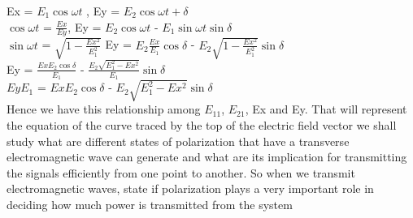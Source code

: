Ex = $E_{1}\cos\omega t$ , Ey  = $E_{2}\cos\omega t + \delta$\\

$\cos\omega t$ = $\frac{Ex}{Ey}$, Ey = $E_{2}\cos\omega t$ - $E_{1}\sin\omega t\sin\delta$\\

$\sin\omega t$ = $\sqrt{1 - \frac{Ex^2}{E_{1}^2}}$ Ey = $E_{2}\frac{Ex}{E_{1}}\cos\delta$ - $E_{2}\sqrt{1 - \frac{Ex^2}{E_{1}^2}}\sin\delta$\\

Ey = $\frac{ExE_{2}\cos\delta}{E_{1}}$ - $\frac{E_{2}\sqrt{E_{1}^2 - Ex^2}}{E_{1}}\sin\delta$
\\

$EyE_{1}$ = $ExE_{2}\cos\delta$ - $E_{2}\sqrt{E_{1}^2 - Ex^2}\sin\delta$\\

Hence we have this relationship among $E_{11}$, $E_{21}$, Ex and Ey. That will represent the equation of the curve traced by the top of the electric field vector we shall study what are different states of polarization that have a transverse electromagnetic wave can generate and what are its implication for transmitting the signals efficiently from one point to another. So when we transmit electromagnetic waves, state if polarization plays a very important role in deciding how much power is transmitted from the system	
